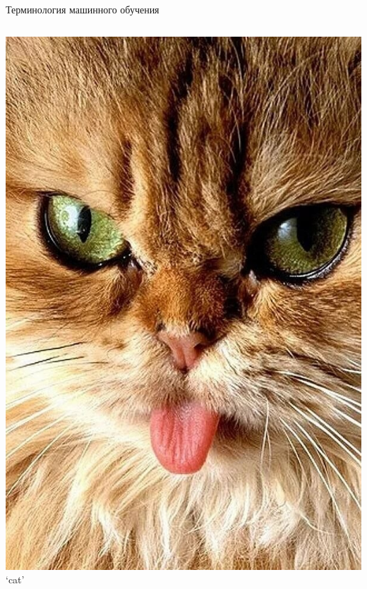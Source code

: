 \documentclass[aspectratio=169, professionalfonts]{beamer}
\begin{document}
\begin{frame}{Терминология машинного обучения}
\begin{columns}
\begin{column}{.1\linewidth}
            \includegraphics[width=\linewidth]{graphs/fig17_9.jpg}
            `cat'
        \end{column}
    \end{columns}
\end{frame}
\end{document}
